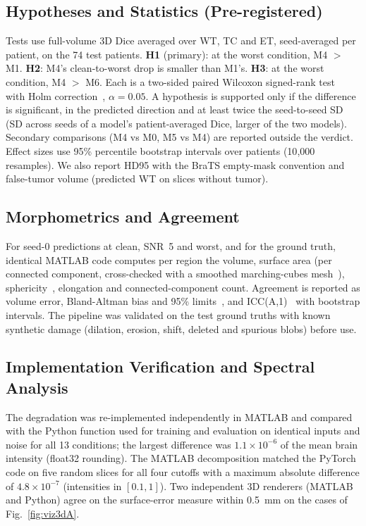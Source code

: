 \documentclass[conference]{IEEEtran}
\begin{document}
\subsection{Hypotheses and Statistics (Pre-registered)}
Tests use full-volume 3D Dice averaged over WT, TC and ET, seed-averaged per patient, on the 74 test patients.
\textbf{H1} (primary): at the worst condition, M4 $>$ M1. \textbf{H2}: M4's clean-to-worst drop is smaller than
M1's. \textbf{H3}: at the worst condition, M4 $>$ M6. Each is a two-sided paired Wilcoxon signed-rank
test~\cite{wilcoxon1945ranking} with Holm correction~\cite{holm1979sequential}, $\alpha = 0.05$. A hypothesis is
supported only if the difference is significant, in the predicted direction and at least twice the seed-to-seed
SD (SD across seeds of a model's patient-averaged Dice, larger of the two models). Secondary comparisons (M4 vs
M0, M5 vs M4) are reported outside the verdict. Effect sizes use 95\% percentile bootstrap intervals over
patients (10{,}000 resamples). We also report HD95 with the BraTS empty-mask convention and false-tumor volume
(predicted WT on slices without tumor).

\subsection{Morphometrics and Agreement}
For seed-0 predictions at clean, SNR~5 and worst, and for the ground truth, identical MATLAB code computes per
region the volume, surface area (per connected component, cross-checked with a smoothed marching-cubes
mesh~\cite{lorensen1987marching}), sphericity~\cite{wadell1935volume}, elongation and connected-component count.
Agreement is reported as volume error, Bland-Altman bias and 95\% limits~\cite{bland1986agreement}, and
ICC(A,1)~\cite{mcgraw1996icc,shrout1979icc} with bootstrap intervals. The pipeline was validated on the test
ground truths with known synthetic damage (dilation, erosion, shift, deleted and spurious blobs) before use.

\subsection{Implementation Verification and Spectral Analysis}
\label{sec:spectral}
The degradation was re-implemented independently in MATLAB and compared with the Python function used for
training and evaluation on identical inputs and noise for all 13 conditions; the largest difference was
$1.1\times10^{-6}$ of the mean brain intensity (float32 rounding). The MATLAB decomposition matched the PyTorch
code on five random slices for all four cutoffs with a maximum absolute difference of $4.8\times10^{-7}$
(intensities in $[0.1, 1]$). Two independent 3D renderers
(MATLAB and Python) agree on the surface-error measure within 0.5~mm on the cases of Fig.~\ref{fig:viz3dA}.
\end{document}
